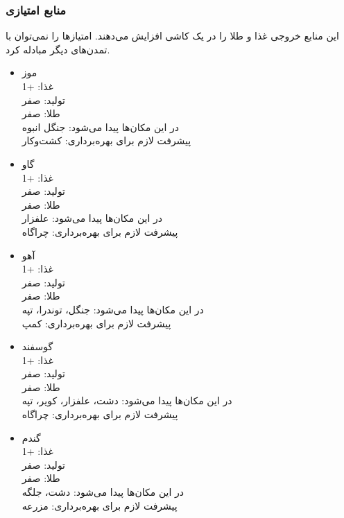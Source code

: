 \documentclass[]{article}
\begin{document}
\subsubsection*{{\titr منابع امتیازی}}
این منابع خروجی غذا و طلا را در یک کاشی افزایش می‌دهند. امتیازها را نمی‌توان با تمدن‌های دیگر مبادله کرد.\\
\begin{itemize}
\item موز\\
غذا: +1\\
تولید‌: صفر\\
طلا: صفر\\
در این مکان‌ها پیدا می‌شود: جنگل انبوه\\
پیشرفت لازم برای بهره‌برداری: کشت‌وکار
\item گاو\\
غذا: +1\\
تولید‌: صفر\\
طلا: صفر\\
در این مکان‌ها پیدا می‌شود: علفزار\\
پیشرفت لازم برای بهره‌برداری: چراگاه
\item آهو\\
غذا: +1\\
تولید‌: صفر\\
طلا: صفر\\
در این مکان‌ها پیدا می‌شود: جنگل، توندرا، تپه\\
پیشرفت لازم برای بهره‌برداری: کمپ
\item گوسفند\\
غذا: +1\\
تولید‌: صفر\\
طلا: صفر\\
در این مکان‌ها پیدا می‌شود: دشت‌، علفزار، کویر، تپه\\
پیشرفت لازم برای بهره‌برداری: چراگاه
\item گندم\\
غذا: +1\\
تولید‌: صفر\\
طلا: صفر\\
در این مکان‌ها پیدا می‌شود: دشت، جلگه\\
پیشرفت لازم برای بهره‌برداری: مزرعه
\end{itemize}
\end{document}
